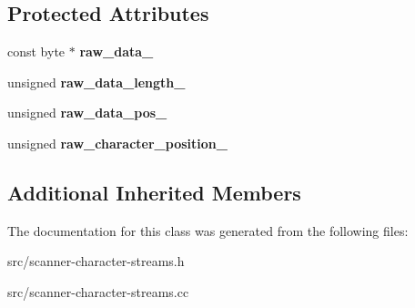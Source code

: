 \subsection*{Protected Attributes}
\begin{DoxyCompactItemize}
\item 
\hypertarget{classv8_1_1internal_1_1_utf8_to_utf16_character_stream_a8e40f877bccff741ffa4205542607806}{}const byte $\ast$ {\bfseries raw\+\_\+data\+\_\+}\label{classv8_1_1internal_1_1_utf8_to_utf16_character_stream_a8e40f877bccff741ffa4205542607806}

\item 
\hypertarget{classv8_1_1internal_1_1_utf8_to_utf16_character_stream_a88b42b3a63b36aacf44313b019870a0a}{}unsigned {\bfseries raw\+\_\+data\+\_\+length\+\_\+}\label{classv8_1_1internal_1_1_utf8_to_utf16_character_stream_a88b42b3a63b36aacf44313b019870a0a}

\item 
\hypertarget{classv8_1_1internal_1_1_utf8_to_utf16_character_stream_af66a95d4d428b8c9e81384360c3438a0}{}unsigned {\bfseries raw\+\_\+data\+\_\+pos\+\_\+}\label{classv8_1_1internal_1_1_utf8_to_utf16_character_stream_af66a95d4d428b8c9e81384360c3438a0}

\item 
\hypertarget{classv8_1_1internal_1_1_utf8_to_utf16_character_stream_ad1ed83c90a234b84b85dfd7dc33045b8}{}unsigned {\bfseries raw\+\_\+character\+\_\+position\+\_\+}\label{classv8_1_1internal_1_1_utf8_to_utf16_character_stream_ad1ed83c90a234b84b85dfd7dc33045b8}

\end{DoxyCompactItemize}
\subsection*{Additional Inherited Members}


The documentation for this class was generated from the following files\+:\begin{DoxyCompactItemize}
\item 
src/scanner-\/character-\/streams.\+h\item 
src/scanner-\/character-\/streams.\+cc\end{DoxyCompactItemize}
